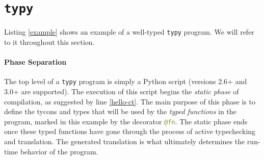 \documentclass[preprint,10pt]{sigplanconf}
\newcommand{\lip}[1]{\lstinline[language=Python,basicstyle=\ttfamily\small,deletendkeywords={tuple,buffer,map}]{#1}}
\begin{document}
\section{\texttt{typy}}\label{usage}


%
Listing \ref{example} shows an example of a well-typed \texttt{typy} program. We will refer to it throughout this section.

\paragraph{Phase Separation} The top level of a \texttt{typy} program is simply a Python script (versions 2.6+ and 3.0+ are supported). The execution of this script begins the \emph{static phase} of compilation, as suggested by line \ref{hello-ct}. The main purpose of this phase is to define the tycons and types that will be used by the \emph{typed functions} in the program, marked in this example by the decorator \lip{@fn}. The static phase ends once  these typed functions have gone through the process of active typechecking and translation. The generated translation is what ultimately determines the run-time behavior of the program. %

\end{document}
